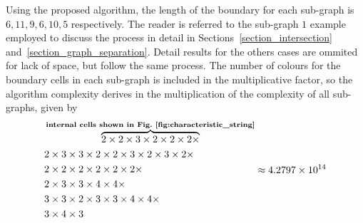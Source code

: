 \documentclass[journal]{IEEEtran}
\begin{document}
Using the proposed algorithm, the length of the boundary for each sub-graph is $6, 11, 9, 6, 10, 5$ respectively. The reader is referred to the sub-graph $1$ example
employed to discuss the process in detail in Sections~\ref{section_intersection} and~\ref{section_graph_separation}. Detail results for the others cases are ommited for lack of space, 
but follow the same process. 
The number of colours for the boundary cells in each sub-graph is included in the multiplicative factor, so the algorithm complexity derives in the multiplication of 
the complexity of all sub-graphs, given by 
\begin{equation}
\begin{aligned}
&\overbrace{2\times2\times3\times2\times2\times2\times}^{\textbf{internal cells shown in Fig.~\ref{fig:characteristic_string}}}\\
&2\times3\times3\times2\times2\times3\times2\times3\times2\times\\
&2\times2\times2\times2\times2\times2\times\\
&2\times3\times3\times4\times4\times\\
&3\times3\times2\times3\times3\times4\times4\times\\
&3\times4\times3
\end{aligned} \approx 4.2797\times10^{14}
\end{equation}
\end{document}
